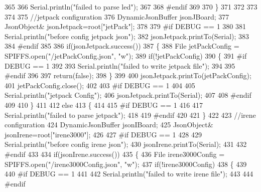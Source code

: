 \begin{DoxyCode}
365 
366         Serial.println(\textcolor{stringliteral}{"failed to parse led"});
367     
368 \textcolor{preprocessor}{    #endif }
369 
370     \}
371         
372 
373     
374 
375     \textcolor{comment}{//jetpack configuration}
376     DynamicJsonBuffer jsonJBoard;
377         JsonObject& jsonJetpack=root[\textcolor{stringliteral}{"jetPack"}];
378 
379 \textcolor{preprocessor}{#if DEBUG == 1 }
380 
381     Serial.println(\textcolor{stringliteral}{"before config jetpack json"});
382     jsonJetpack.printTo(Serial);
383 
384 \textcolor{preprocessor}{#endif}
385 
386     \textcolor{keywordflow}{if}(jsonJetpack.success())
387     \{   
388         File jetPackConfig = SPIFFS.open(\textcolor{stringliteral}{"/jetPackConfig.json"}, \textcolor{stringliteral}{"w"});   
389         \textcolor{keywordflow}{if}(!jetPackConfig)
390         \{
391 \textcolor{preprocessor}{        #if DEBUG == 1}
392 
393             Serial.println(\textcolor{stringliteral}{"failed to write jetpack file"});
394         
395 \textcolor{preprocessor}{        #endif}
396 
397             \textcolor{keywordflow}{return}(\textcolor{keyword}{false});
398         \}
399 
400         jsonJetpack.printTo(jetPackConfig);
401         jetPackConfig.close();
402 
403 \textcolor{preprocessor}{    #if DEBUG == 1}
404 
405         Serial.println(\textcolor{stringliteral}{"jetpack Config"});   
406         jsonJetpack.printTo(Serial);
407     
408 \textcolor{preprocessor}{    #endif}
409 
410     \}
411 
412     \textcolor{keywordflow}{else}
413     \{
414     
415 \textcolor{preprocessor}{    #if DEBUG == 1 }
416 
417         Serial.println(\textcolor{stringliteral}{"failed to parse jetpack"});  
418     
419 \textcolor{preprocessor}{    #endif}
420 
421     \}
422     
423     \textcolor{comment}{//irene configuration   }
424     DynamicJsonBuffer jsonIBoard;
425         JsonObject& jsonIrene=root[\textcolor{stringliteral}{"irene3000"}];
426     
427 \textcolor{preprocessor}{#if DEBUG == 1 }
428 
429     Serial.println(\textcolor{stringliteral}{"before config irene json"}); 
430     jsonIrene.printTo(Serial);
431 
432 \textcolor{preprocessor}{#endif }
433 
434     \textcolor{keywordflow}{if}(jsonIrene.success())
435     \{
436         File irene3000Config = SPIFFS.open(\textcolor{stringliteral}{"/irene3000Config.json"}, \textcolor{stringliteral}{"w"});   
437         \textcolor{keywordflow}{if}(!irene3000Config)
438         \{
439 
440 \textcolor{preprocessor}{        #if DEBUG == 1 }
441 
442             Serial.println(\textcolor{stringliteral}{"failed to write irene file"});
443         
444 \textcolor{preprocessor}{        #endif}

\end{DoxyCode}
